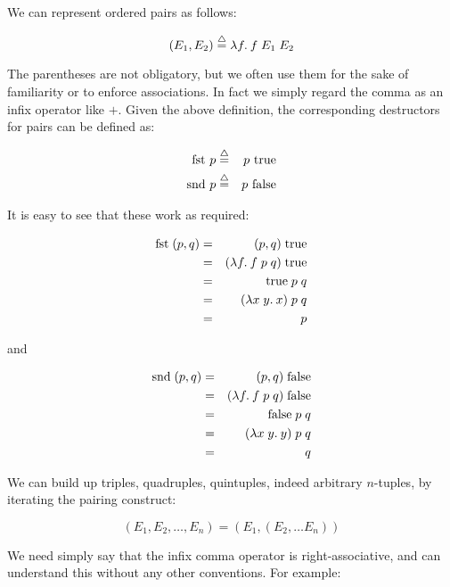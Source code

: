 We can represent ordered pairs as follows:

$$ (E_1,E_2) \stackrel{\bigtriangleup}{=} \lambda f.\: f\; E_1\; E_2 $$

The parentheses are not obligatory, but we often use them for the sake of
familiarity or to enforce associations. In fact we simply regard the comma as
an infix operator like $+$. Given the above definition, the corresponding
destructors for pairs can be defined as:

\begin{eqnarray*}
\mbox{fst } p & \stackrel{\bigtriangleup}{=} & p \mbox{ true}                                 \\
\mbox{snd } p & \stackrel{\bigtriangleup}{=} & p \mbox{ false}
\end{eqnarray*}

\noindent It is easy to see that these work as required:

\begin{eqnarray*}
\mbox{fst}\; (p,q) & = & (p,q)\; \mbox{true}                            \\
                   & = & (\lambda f.\: f\; p\; q)\; \mbox{true}             \\
                   & = & \mbox{true}\; p\; q                            \\
                   & = & (\lambda x\; y.\: x)\; p\; q                       \\
                   & = & p
\end{eqnarray*}

\noindent and

\begin{eqnarray*}
\mbox{snd}\; (p,q) & = & (p,q)\; \mbox{false}                           \\
                   & = & (\lambda f.\: f\; p\; q)\; \mbox{false}            \\
                   & = & \mbox{false}\; p\; q                           \\
                   & = & (\lambda x\; y.\: y)\; p\; q                       \\
                   & = & q
\end{eqnarray*}

We can build up triples, quadruples, quintuples, indeed arbitrary $n$-tuples,
by iterating the pairing construct:

$$ (E_1,E_2,\ldots,E_n) = (E_1,(E_2,\ldots E_n)) $$

We need simply say that the infix comma operator is right-associative, and can
understand this without any other conventions. For example:

